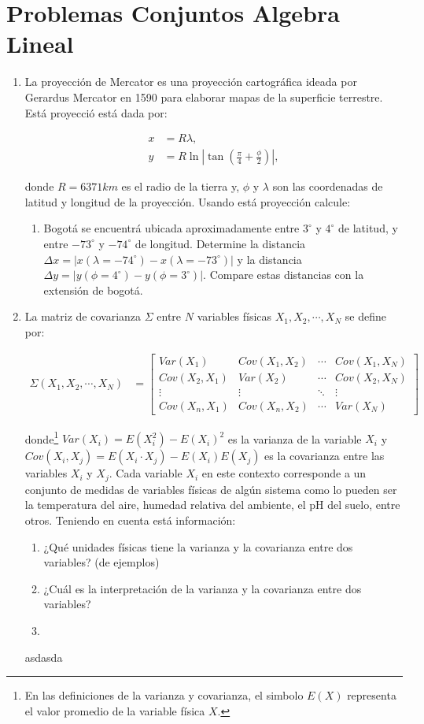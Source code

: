 \documentclass{article}
\begin{document}
\section{Problemas Conjuntos Algebra Lineal}
\begin{enumerate}


\item La proyección de Mercator es una proyección cartográfica ideada por Gerardus Mercator en 1590 para elaborar mapas de la superficie terrestre. Está proyecció está dada por:

\begin{align*}
x&=R\lambda, \\
y&=R\ln\left|\tan\left(\frac{\pi}{4}+\frac{\phi}{2}\right)\right|,
\end{align*}

donde $R=6371km$ es el radio de la tierra y, $\phi$ y  $\lambda$ son las coordenadas de latitud y longitud de la proyección. Usando está proyección calcule:

\begin{enumerate}
\item Bogotá se encuentrá ubicada aproximadamente entre $3^{\circ}$ y $4^{\circ}$ de latitud, y entre $-73^{\circ}$ y $-74^{\circ}$ de longitud. Determine la distancia $\Delta x=|x(\lambda=-74^{\circ})-x(\lambda=-73^{\circ})|$ y la distancia\\
\noindent $\Delta y=|y(\phi=4^{\circ})-y(\phi=3^{\circ})|$. Compare estas distancias con la extensión de bogotá.
\end{enumerate}

\item La matriz de covarianza $\Sigma$ entre $N$ variables físicas $X_{1},X_{2},\cdots, X_{N}$ se define por:

\begin{align*}
\Sigma(X_{1},X_{2},\cdots, X_{N})&=\left[\begin{matrix}
Var(X_{1}) & Cov(X_{1},X_{2}) & \cdots & Cov(X_{1},X_{N})\\
Cov(X_{2},X_{1}) & Var(X_{2}) & \cdots & Cov(X_{2},X_{N})\\
\vdots & \vdots & \ddots & \vdots \\
Cov(X_{n},X_{1}) & Cov(X_{n},X_{2}) & \cdots & Var(X_{N})
\end{matrix}\right]
\end{align*}

\noindent donde\footnote{En las definiciones de la varianza y covarianza, el simbolo $E(X)$ representa el valor promedio de la variable física $X$.} $Var(X_{i})=E(X_{i}^2)-E(X_{i})^2$ es la varianza de la variable $X_{i}$ y $Cov(X_{i},X_{j})=E(X_{i}\cdot X_{j})-E(X_{i})E(X_{j})$ es la covarianza entre las variables $X_{i}$ y $X_{j}$. Cada variable $X_{i}$ en este contexto corresponde a un conjunto de medidas de variables físicas de algún sistema como lo pueden ser la temperatura del aire, humedad relativa del ambiente, el pH del suelo, entre otros. Teniendo en cuenta está información: 

\begin{enumerate}
\item ¿Qué unidades físicas tiene la varianza y la covarianza entre dos variables? (de ejemplos)
\item ¿Cuál es la interpretación de la varianza y la covarianza entre dos variables?
\item 
\end{enumerate}
asdasda
\end{enumerate}
\end{document}
